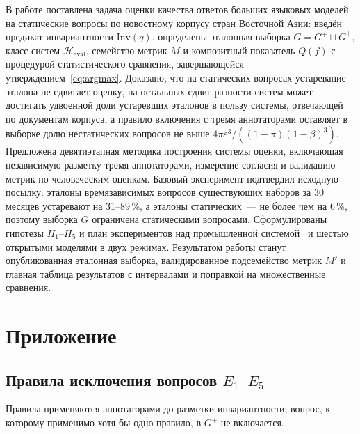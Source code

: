 \documentclass{article}
\newcommand{\Inv}{\mathrm{Inv}}
\newcommand{\Heval}{\mathcal{H}_{\mathrm{eval}}}
\newcommand{\refuse}{\bot}                          %
\begin{document}
В работе поставлена задача оценки качества ответов больших языковых моделей на статические вопросы по новостному корпусу стран Восточной Азии: введён предикат инвариантности $\Inv(q)$, определены эталонная выборка $G=G^+\sqcup G^{\refuse}$, класс систем $\Heval$, семейство метрик $M$ и композитный показатель $Q(f)$ с процедурой статистического сравнения, завершающейся утверждением~\eqref{eq:argmax}. Доказано, что на статических вопросах устаревание эталона не сдвигает оценку, на остальных сдвиг разности систем может достигать удвоенной доли устаревших эталонов в пользу системы, отвечающей по документам корпуса, а правило включения с тремя аннотаторами оставляет в выборке долю нестатических вопросов не выше $4\pi\varepsilon^3/((1-\pi)(1-\beta)^3)$. Предложена девятиэтапная методика построения системы оценки, включающая независимую разметку тремя аннотаторами, измерение согласия и валидацию метрик по человеческим оценкам. Базовый эксперимент подтвердил исходную посылку: эталоны времязависимых вопросов существующих наборов за 30 месяцев устаревают на 31--89\,\%, а эталоны статических~--- не более чем на 6\,\%, поэтому выборка $G$ ограничена статическими вопросами. Сформулированы гипотезы $H_1$--$H_5$ и план экспериментов над промышленной системой~\cite{bagrov2026digital} и шестью открытыми моделями в двух режимах. Результатом работы станут опубликованная эталонная выборка, валидированное подсемейство метрик $M'$ и главная таблица результатов с интервалами и поправкой на множественные сравнения.






\newpage
\appendix
\section{Приложение}\label{app}

\subsection{Правила исключения вопросов $E_1$--$E_5$}\label{app:rules}

Правила применяются аннотаторами до разметки инвариантности; вопрос, к которому применимо хотя бы одно правило, в $G^+$ не включается.
\end{document}
